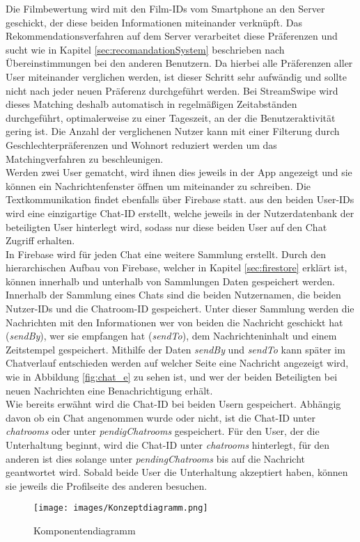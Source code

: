Die Filmbewertung wird mit den Film-IDs vom Smartphone an den Server geschickt, der diese beiden Informationen miteinander verknüpft. Das Rekommendationsverfahren auf dem Server verarbeitet diese Präferenzen und sucht wie in Kapitel \ref{sec:recomandationSystem} beschrieben nach Übereinstimmungen bei den anderen Benutzern. Da hierbei alle Präferenzen aller User miteinander verglichen werden, ist dieser Schritt sehr aufwändig und sollte nicht nach jeder neuen Präferenz durchgeführt werden. Bei StreamSwipe wird dieses Matching deshalb automatisch in regelmäßigen Zeitabständen durchgeführt, optimalerweise zu einer Tageszeit, an der die Benutzeraktivität gering ist. Die Anzahl der verglichenen Nutzer kann mit einer Filterung durch Geschlechterpräferenzen und Wohnort reduziert werden um das Matchingverfahren zu beschleunigen. \\
Werden zwei User gematcht, wird ihnen dies jeweils in der App angezeigt und sie können ein Nachrichtenfenster öffnen um miteinander zu schreiben. Die Textkommunikation findet ebenfalls über  Firebase statt. aus den beiden User-IDs wird eine einzigartige Chat-ID erstellt, welche jeweils in der Nutzerdatenbank der beteiligten User hinterlegt wird, sodass nur diese beiden User auf den Chat Zugriff erhalten.\\
In Firebase wird für jeden Chat eine weitere Sammlung erstellt. Durch den hierarchischen Aufbau von Firebase, welcher in Kapitel \ref{sec:firestore} erklärt ist, können innerhalb und unterhalb von Sammlungen Daten gespeichert werden. Innerhalb der Sammlung eines Chats sind die beiden Nutzernamen, die beiden Nutzer-IDs und die Chatroom-ID gespeichert. Unter dieser Sammlung werden die Nachrichten mit den Informationen wer von beiden die Nachricht geschickt hat (\textit{sendBy}), wer sie empfangen hat (\textit{sendTo}), dem Nachrichteninhalt und einem Zeitstempel gespeichert. Mithilfe der Daten \textit{sendBy} und \textit{sendTo} kann später im Chatverlauf entschieden werden auf welcher Seite eine Nachricht angezeigt wird, wie in Abbildung \ref{fig:chat_e} zu sehen ist, und wer der beiden Beteiligten bei neuen Nachrichten eine Benachrichtigung erhält.\\
Wie bereits erwähnt wird die Chat-ID bei beiden Usern gespeichert. Abhängig davon ob ein Chat angenommen wurde oder nicht, ist die Chat-ID unter \textit{chatrooms} oder unter \textit{pendigChatrooms} gespeichert. Für den User, der die Unterhaltung beginnt, wird die Chat-ID unter \textit{chatrooms} hinterlegt, für den anderen ist dies solange unter \textit{pendingChatrooms} bis auf die Nachricht geantwortet wird. Sobald beide User die Unterhaltung akzeptiert haben, können sie jeweils die Profilseite des anderen besuchen.


\begin{figure}[tbt]
\centering
\texttt{[image: images/Konzeptdiagramm.png]}
\caption{Komponentendiagramm}
\label{fig:komponentendiagramm}
\end{figure}




